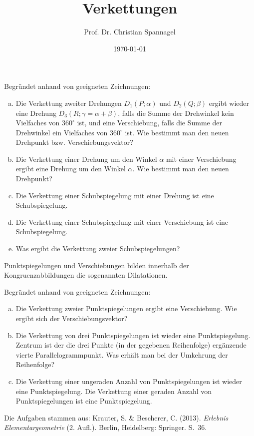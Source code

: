 \documentclass{../cssheet}
\title{Verkettungen}
\author{Prof. Dr. Christian Spannagel}
\date{\today}
\begin{document}
\printtitle

\begin{aufgabe}

Begründet anhand von geeigneten Zeichnungen: 
\begin{enumerate}[a)]
\item Die Verkettung zweiter Drehungen $D_{1}(P;\alpha)$ und $D_{2}(Q;\beta)$ ergibt wieder eine Drehung $D_{3}(R;\gamma=\alpha+\beta)$, falls die Summe der Drehwinkel kein Vielfaches von $360^{\circ}$ ist, und eine Verschiebung, falls die Summe der Drehwinkel ein Vielfaches von $360^{\circ}$ ist. Wie bestimmt man den neuen Drehpunkt bzw. Verschiebungsvektor?
\item Die Verkettung einer Drehung um den Winkel $\alpha$ mit einer Verschiebung ergibt eine Drehung um den Winkel $\alpha$. Wie bestimmt man den neuen Drehpunkt?
\item Die Verkettung einer Schubspiegelung mit einer Drehung ist eine Schubspiegelung.
\item Die Verkettung einer Schubspiegelung mit einer Verschiebung ist eine Schubspiegelung.
\item Was ergibt die Verkettung zweier Schubspiegelungen?

\end{enumerate}
\end{aufgabe}

\begin{aufgabe}[Dilatationen]

Punktspiegelungen und Verschiebungen bilden innerhalb der Kongruenzabbildungen die sogenannten Dilatationen.

Begründet anhand von geeigneten Zeichnungen: 
\begin{enumerate}[a)]
	\item Die Verkettung zweier Punktspiegelungen ergibt eine Verschiebung. Wie ergibt sich der Verschiebungsvektor?
	\item Die Verkettung von drei Punktspiegelungen ist wieder eine Punktspiegelung. Zentrum ist der die drei Punkte (in der gegebenen Reihenfolge) ergänzende vierte Parallelogrammpunkt. Was erhält man bei der Umkehrung der Reihenfolge?
	\item Die Verkettung einer ungeraden Anzahl von Punktspiegelungen ist wieder eine Punktspiegelung. Die Verkettung einer geraden Anzahl von Punktspiegelungen ist eine Punktspiegelung.
\end{enumerate}
\end{aufgabe}

Die Aufgaben stammen aus: Krauter, S. \& Bescherer, C. (2013). \emph{Erlebnis Elementargeometrie} (2. Aufl.). Berlin, Heidelberg: Springer. S.~36.

\vspace*{10mm}

\printlicense

\printsocials
\end{document}
